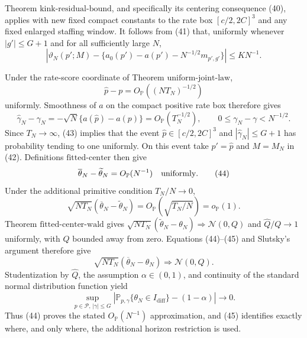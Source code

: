 Theorem \(\mathrm{kink\mbox{-}residual\mbox{-}bound}\), and specifically its centering consequence (40), applies with new fixed compact constants to the rate box \([c/2,2C]^3\) and any fixed enlarged staffing window.  It follows from (41) that, uniformly whenever \(|g'|\leq G+1\) and for all sufficiently large \(N\),
\[
 \left|\vartheta_N(p';M)-\{a_0(p')-a(p')-N^{-1/2}m_{p',g'}\}\right|
 \leq K N^{-1}.                                                  \tag{42}
\]

Under the rate-score coordinate of Theorem \(\mathrm{uniform\mbox{-}joint\mbox{-}law}\),
\[
 \widehat p-p=O_{\mathbb P}((NT_N)^{-1/2})
\]
uniformly.  Smoothness of \(a\) on the compact positive rate box therefore gives
\[
 \widehat\gamma_N-\gamma_N
 =-\sqrt N\{a(\widehat p)-a(p)\}
 =O_{\mathbb P}(T_N^{-1/2}),
 \qquad 0\leq\gamma_N-\gamma<N^{-1/2}.                          \tag{43}
\]
Since \(T_N\to\infty\), (43) implies that the event
\(\widehat p\in[c/2,2C]^3\) and \(|\widehat\gamma_N|\leq G+1\) has probability tending to one uniformly.  On this event take \(p'=\widehat p\) and \(M=M_N\) in (42).  Definitions \(\mathrm{fitted\mbox{-}center}\) then give
\[
 \overline\theta_N-\widetilde\theta_N=O_{\mathbb P}(N^{-1})
 \quad\hbox{uniformly}.                                         \tag{44}
\]
Under the additional primitive condition \(T_N/N\to0\),
\[
 \sqrt{NT_N}(\overline\theta_N-\widetilde\theta_N)
 =O_{\mathbb P}(\sqrt{T_N/N})=o_{\mathbb P}(1).                 \tag{45}
\]
Theorem \(\mathrm{fitted\mbox{-}center\mbox{-}wald}\) gives
\(\sqrt{NT_N}(\widetilde\theta_N-\theta_N)\Rightarrow\mathcal N(0,Q)\) and \(\widehat Q/Q\to1\) uniformly, with \(Q\) bounded away from zero.  Equations (44)--(45) and Slutsky's argument therefore give
\[
 \sqrt{NT_N}(\overline\theta_N-\theta_N)
 \Rightarrow\mathcal N(0,Q).
\]
Studentization by \(\widehat Q\), the assumption \(\alpha\in(0,1)\), and continuity of the standard normal distribution function yield
\[
 \sup_{p\in\mathcal P,\,|\gamma|\leq G}
 \left|\mathbb P_{p,\gamma}\{\theta_N\in I_{\mathrm{diff}}\}-(1-\alpha)\right|\longrightarrow0.
\]
Thus (44) proves the stated \(O_{\mathbb P}(N^{-1})\) approximation, and (45) identifies exactly where, and only where, the additional horizon restriction is used.
